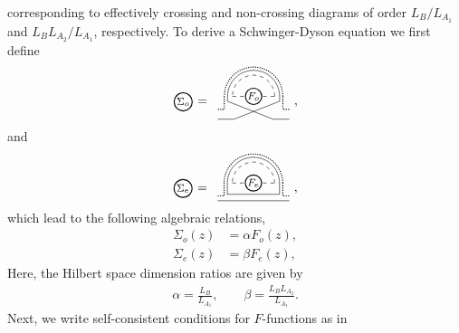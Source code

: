 \documentclass[aps,pra,groupedaddress,twocolumn,notitlepage,superscriptaddress,10pt]{revtex4-1}
\begin{document}
corresponding to effectively crossing and non-crossing diagrams of order $L_B/L_{A_1}$ and $L_B L_{A_2}/L_{A_1}$, respectively.
To derive a Schwinger-Dyson equation we first define 
\begin{align}
\tikz[baseline=-0.5ex]{
    \draw[thick] (0,0) circle (0.25) node[anchor=center] {\footnotesize $\Sigma_o$};
    }
=
\ \,
\tikz[scale=.9,baseline=-1.5ex]{
    \draw[dashed] (-0.15,0) -- (1.15,0);
    \draw[thick,fill=white] (0.5,0) circle (0.25) node[anchor=center] {\footnotesize$F_o$};
    \draw (-0.3,0.0)-- (-0.3,-0.15);
    \draw (-0.3,-0.15)-- (1.1,-0.7);
    \draw (1.3,-0.15)-- (1.3,0.0);
    \draw (1.3,-0.15)-- (-0.1,-0.7);
    \draw (-0.6,-0.7)-- (-0.1,-0.7);
    \draw (1.1,-0.7)-- (1.6,-0.7);
    \draw[densely dotted,thick]   (-0.4,0.0)-- (-0.4,-0.4)--  (-0.6,-0.4);
    \draw[densely dotted,thick] (1.4,0.0) -- (1.4,-0.4) -- (1.6,-0.4) ;
    \draw[dashed] (1.15,0) arc (0:180:0.65);
    \draw (1.3,0) arc (0:180:0.8);
    \draw[densely dotted,thick] (1.4,0) arc (0:180:0.9);
    }\ ,
\end{align}
and
\begin{align}
\tikz[baseline=-0.5ex]{
    \draw[thick] (0,0) circle (0.25) node[anchor=center] {\footnotesize $\Sigma_e$};
    }
=
\ \,
\tikz[scale=.9,baseline=-1.5ex]{
    \draw[dashed] (-0.15,0) -- (1.15,0);
    \draw[thick,fill=white] (0.5,0) circle (0.25) node[anchor=center] {\footnotesize$F_e$};
    \draw (-0.3,0.0)-- (-0.3,-0.35)-- (1.3,-0.35) -- (1.3,0);
    \draw (-0.6,-0.55)-- (1.6,-0.55);
    \draw[densely dotted,thick]   (-0.4,0.0)-- (-0.4,-0.4)--  (-0.6,-0.4);
    \draw[densely dotted,thick] (1.4,0.0) -- (1.4,-0.4) -- (1.6,-0.4) ;
    \draw[dashed] (1.15,0) arc (0:180:0.65);
    \draw (1.3,0) arc (0:180:0.8);
    \draw[densely dotted,thick] (1.4,0) arc (0:180:0.9);
    }\ ,
\end{align}
which lead to the following algebraic relations,
\begin{align}
\Sigma_o(z)  &= \alpha F_o(z), \\
\Sigma_e(z)  &= \beta F_e(z), 
\end{align}
Here, the Hilbert space dimension ratios  are given by
\begin{align}
\alpha = \frac{L_B}{L_{A_1}}, \qquad
\beta= \frac{L_B L_{A_2}}{L_{A_1}}.
\end{align}
Next, we write self-consistent conditions for $F$-functions as in
\end{document}
